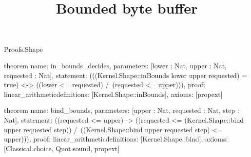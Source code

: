 \begin{lexlean}{Proofs.Shape}
\title{Bounded byte buffer}
\begin{semanticmodule}
theorem{
  name: in_bounds_decides,
  parameters: [lower : Nat, upper : Nat, requested : Nat],
  statement: (((Kernel.Shape::inBounds lower upper requested) = true) <-> ((lower <= requested) /\ (requested <= upper))),
  proof: linear_arithmetic{definitions: [Kernel.Shape::inBounds]},
  axioms: [propext]
}

theorem{
  name: bind_bounds,
  parameters: [upper : Nat, requested : Nat, step : Nat],
  statement: ((requested <= upper) -> ((requested <= (Kernel.Shape::bind upper requested step)) /\ ((Kernel.Shape::bind upper requested step) <= upper))),
  proof: linear_arithmetic{definitions: [Kernel.Shape::bind]},
  axioms: [Classical.choice, Quot.sound, propext]
}
\end{semanticmodule}
\end{lexlean}
